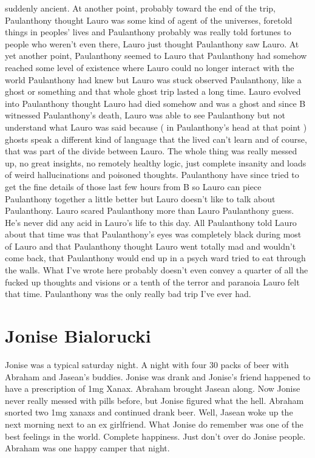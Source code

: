 \documentclass[12pt]{book}
\begin{document}
suddenly ancient. At another point, probably toward the end of the trip, Paulanthony thought Lauro was some kind of agent of the universes, foretold things in peoples' lives and Paulanthony probably was really told fortunes to people who weren't even there, Lauro just thought Paulanthony saw Lauro. At yet another point, Paulanthony seemed to Lauro that Paulanthony had somehow reached some level of existence where Lauro could no longer interact with the world Paulanthony had knew but Lauro was stuck observed Paulanthony, like a ghost or something and that whole ghost trip lasted a long time. Lauro evolved into Paulanthony thought Lauro had died somehow and was a ghost and since B witnessed Paulanthony's death, Lauro was able to see Paulanthony but not understand what Lauro was said because ( in Paulanthony's head at that point ) ghosts speak a different kind of language that the lived can't learn and of course, that was part of the divide between Lauro. The whole thing was really messed up, no great insights, no remotely healthy logic, just complete insanity and loads of weird hallucinations and poisoned thoughts. Paulanthony have since tried to get the fine details of those last few hours from B so Lauro can piece Paulanthony together a little better but Lauro doesn't like to talk about Paulanthony. Lauro scared Paulanthony more than Lauro Paulanthony guess. He's never did any acid in Lauro's life to this day. All Paulanthony told Lauro about that time was that Paulanthony's eyes was completely black during most of Lauro and that Paulanthony thought Lauro went totally mad and wouldn't come back, that Paulanthony would end up in a psych ward tried to eat through the walls. What I've wrote here probably doesn't even convey a quarter of all the fucked up thoughts and visions or a tenth of the terror and paranoia Lauro felt that time. Paulanthony was the only really bad trip I've ever had.



\chapter{Jonise Bialorucki}

Jonise was a typical saturday night. A night with four 30 packs of beer with Abraham and Jasean's buddies. Jonise was drank and Jonise's friend happened to have a prescription of 1mg Xanax. Abraham brought Jasean along. Now Jonise never really messed with pills before, but Jonise figured what the hell. Abraham snorted two 1mg xanaxs and continued drank beer. Well, Jasean woke up the next morning next to an ex girlfriend. What Jonise do remember was one of the best feelings in the world. Complete happiness. Just don't over do Jonise people. Abraham was one happy camper that night.
\end{document}

